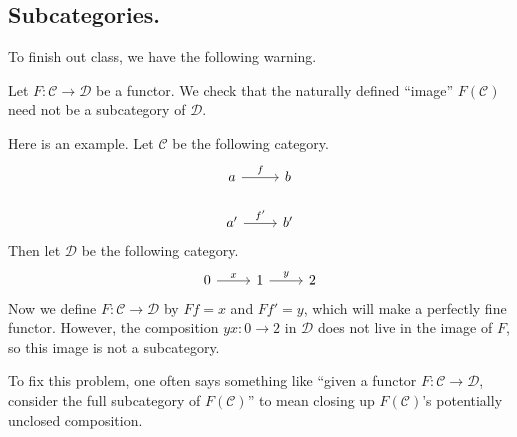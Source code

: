 \subsection{Subcategories.}
To finish out class, we have the following warning.
\begin{warn}
	Let $F:\mathcal C\to\mathcal D$ be a functor. We check that the naturally defined ``image'' $F(\mathcal C)$ need not be a subcategory of $\mathcal D$.
\end{warn}
Here is an example. Let $\mathcal C$ be the following category.
\[\begin{tikzcd}
	a & b \\
	{a'} & {b'}
	\arrow["f", from=1-1, to=1-2]
	\arrow["{f'}", from=2-1, to=2-2]
\end{tikzcd}\]
Then let $\mathcal D$ be the following category.
\[\begin{tikzcd}
	0 & 1 & 2
	\arrow["x", from=1-1, to=1-2]
	\arrow["y", from=1-2, to=1-3]
\end{tikzcd}\]
Now we define $F:\mathcal C\to\mathcal D$ by $Ff=x$ and $Ff'=y$, which will make a perfectly fine functor. However, the composition $yx:0\to2$ in $\mathcal D$ does not live in the image of $F$, so this image is not a subcategory.

To fix this problem, one often says something like ``given a functor $F:\mathcal C\to\mathcal D$, consider the full subcategory of $F(\mathcal C)$'' to mean closing up $F(\mathcal C)$'s potentially unclosed composition.